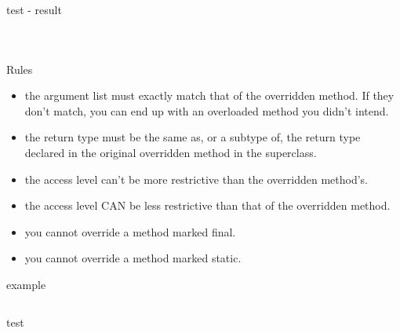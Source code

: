 \documentclass[a4paper, 11pt]{beamer}
\begin{document}
\begin{frame}{test - result}

\begin{columns}
    \begin{column}{.3\linewidth}
      \inputminted[bgcolor=bg, fontsize=\tiny]{java}{./src/overriding/Polygon3.java}        
    \end{column}
\vline
    \begin{column}{.5\linewidth}
       \inputminted[bgcolor=bg, fontsize=\tiny]{java}{./src/overriding/Polygon3TestFail.java}
   
    \end{column}
  \end{columns}
\end{frame}


\begin{frame}{Rules}
\begin{itemize}
\item the argument list must exactly match that of the overridden method. If they
don't match, you can end up with an overloaded method you didn't intend.
\item  the return type must be the same as, or a subtype of, the return type declared
in the original overridden method in the superclass. 
\item the access level can't be more restrictive than the overridden method's.
\item the access level CAN be less restrictive than that of the overridden method.
\item you cannot override a method marked final.
\item you cannot override a method marked static.
\end{itemize}
\end{frame}






\begin{frame}{example}
\inputminted[bgcolor=bg, fontsize=\tiny]{java}{./src/overriding/Polygon4.java}
\end{frame}

\begin{frame}{test}

\begin{columns}
    \begin{column}{.3\linewidth}
      \inputminted[bgcolor=bg, fontsize=\tiny]{java}{./src/overriding/Polygon4.java}        
    \end{column}
\vline
    \begin{column}{.5\linewidth}
       \inputminted[bgcolor=bg, fontsize=\tiny]{java}{./src/overriding/Polygon4Test.java}
   
    \end{column}
  \end{columns}
\end{frame}
\end{document}
